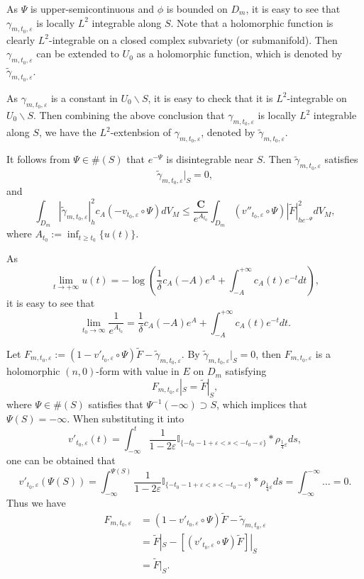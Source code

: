 As $\Psi$ is upper-semicontinuous and $\phi$ is bounded on $D_{m}$,
it is easy to see that $\gamma_{m,t_0,\varepsilon}$ is locally
$L^{2}$ integrable along $S$. Note that a holomorphic function is clearly $L^2$-integrable on a closed complex subvariety (or submanifold). Then $\gamma_{m,t_0,\varepsilon}$ can
be extended to $U_{0}$ as a holomorphic function, which is denoted
by $\tilde{\gamma}_{m,t_0,\varepsilon}$.

\begin{remark}
As $\gamma_{m,t_0,\varepsilon}$ is a constant in $U_0\backslash S$, it is easy to check that it is $L^2$-integrable on $U_0\backslash S$. Then combining the above conclusion that $\gamma_{m,t_0,\varepsilon}$ is locally
$L^{2}$ integrable along $S$, we have the $L^2$-extenbsion of $\gamma_{m,t_0,\varepsilon}$, denoted by $\tilde{\gamma}_{m,t_0,\varepsilon}$.
\end{remark}

It follows from $\Psi\in \#(S)$ that $e^{-\Psi}$ is disintegrable
near $S$. Then $\tilde{\gamma}_{m,t_0,\varepsilon}$ satisfies
$$\tilde{\gamma}_{m,t_0,\varepsilon}|_{S}=0,$$ and
\begin{equation}
\label{equ:smooth.vector3.3}\int_{ D_m}|\tilde{\gamma}_{m,t_0,\varepsilon}|^{2}_{h}c_{A}
(-v_{t_0,\varepsilon}\circ\Psi)dV_{M}
\leq\frac{\mathbf{C}}{e^{A_{t_0}}}\int_{D_m}
(v''_{t_0,\varepsilon}\circ{\Psi})| \tilde{F}|^2_{he^{-\Psi}}dV_M,
\end{equation}
where $A_{t_0}:=\inf_{t\geq t_0}\{u(t)\}$.

As
$$\lim_{t\to+\infty}u(t)=-\log(\frac{1}{\delta}c_{A}(-A)e^A+\int_{-A}^{+\infty}c_{A}(t)e^{-t}dt),$$
it is easy to see that
$$\lim_{t_{0}\to\infty}\frac{1}{e^{A_{t_0}}}=\frac{1}{\delta}c_{A}(-A)e^A+\int_{-A}^{+\infty}c_{A}(t)e^{-t}dt.$$

Let
$F_{m,t_0,\varepsilon}:=(1-v'_{t_0,\varepsilon}\circ\Psi)\widetilde{F}-\tilde{\gamma}_{m,t_0,\varepsilon}$.
By $\tilde{\gamma}_{m,t_0,\varepsilon}|_{S}=0$, then
$F_{m,t_0,\varepsilon}$ is a holomorphic $(n,0)$-form with value in
$E$ on $D_{m}$ satisfying
$$F_{m,t_0,\varepsilon}|_{S}=\tilde{F}|_{S},$$
where $\Psi\in \#(S)$ satisfies that $\Psi^{-1}(-\infty)\supset S$, which implices that $\Psi(S)=-\infty$.
When substituting it into
$$v'_{t_0,\varepsilon}(t)=\int_{-\infty}^{t}\frac{1}{1-2\varepsilon}
\mathbb{I}_{\{-t_{0}-1+\varepsilon<
s<-t_{0}-\varepsilon\}}*\rho_{\frac{1}{4}\varepsilon}ds,$$
one can be obtained that 
\[
  v'_{t_0,\varepsilon}(\Psi(S))=\int_{-\infty}^{\Psi(S)}\frac{1}{1-2\varepsilon}
\mathbb{I}_{\{-t_{0}-1+\varepsilon<
s<-t_{0}-\varepsilon\}}*\rho_{\frac{1}{4}\varepsilon}ds=\int_{-\infty}^{-\infty}\ldots=0.
\]
Thus we have 
\begin{align*}
    F_{m,t_0,\varepsilon}&=(1-v'_{t_0,\varepsilon}\circ\Psi)\widetilde{F}-\tilde{\gamma}_{m,t_0,\varepsilon}\\ 
    &=\widetilde{F}|_S-[(v'_{t_0,\varepsilon}\circ\Psi)\widetilde{F}]|_S\\
    &=\widetilde{F}|_S.
\end{align*}

